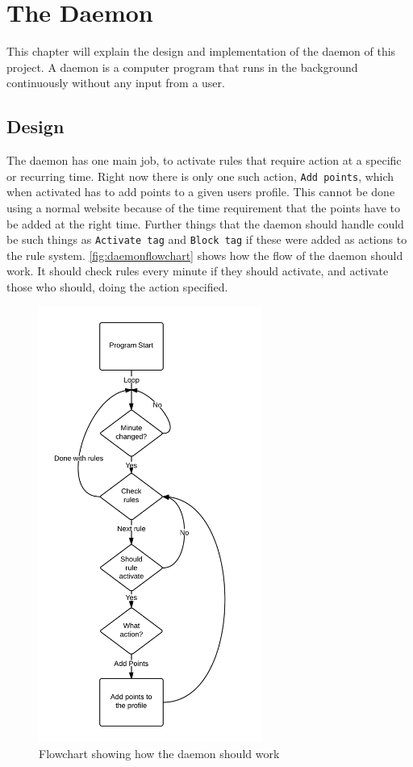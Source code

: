 \chapter{The Daemon}
\label{chap:daemon}
This chapter will explain the design and implementation of the daemon of this project. A daemon is a computer program that runs in the background continuously without any input from a user.
\section{Design}
The daemon has one main job, to activate rules that require action at a specific or recurring time. Right now there is only one such action, \texttt{Add points}, which when activated has to add points to a given users profile. This cannot be done using a normal website because of the time requirement that the points have to be added at the right time. Further things that the daemon should handle could be such things as \texttt{Activate tag} and \texttt{Block tag} if these were added as actions to the rule system. \autoref{fig:daemonflowchart} shows how the flow of the daemon should work. It should check rules every minute if they should activate, and activate those who should, doing the action specified.

\begin{figure}[!h]
	\centering
		\includegraphics[width=0.65\textwidth]{images/daemonflowchart.png}
	\caption{Flowchart showing how the daemon should work}
	\label{fig:daemonflowchart}
\end{figure}

